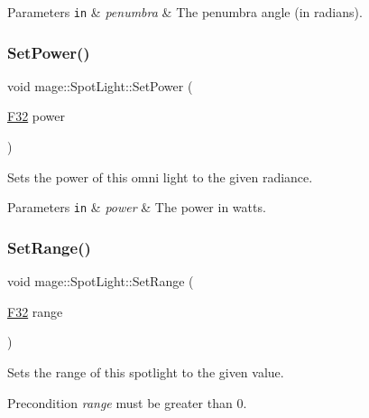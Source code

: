 \begin{DoxyParams}[1]{Parameters}
\mbox{\tt in}  & {\em penumbra} & The penumbra angle (in radians). \\
\hline
\end{DoxyParams}
\hypertarget{classmage_1_1_spot_light_aa2f5ad93e148d2d4fcf1512869c1ffa2}{}\label{classmage_1_1_spot_light_aa2f5ad93e148d2d4fcf1512869c1ffa2} 
\subsubsection{\texorpdfstring{Set\+Power()}{SetPower()}}
{\footnotesize\ttfamily void mage\+::\+Spot\+Light\+::\+Set\+Power (\begin{DoxyParamCaption}\item[{\hyperlink{namespacemage_aa97e833b45f06d60a0a9c4fc22ae02c0}{F32}}]{power }\end{DoxyParamCaption})\hspace{0.3cm}{\ttfamily [noexcept]}}

Sets the power of this omni light to the given radiance.


\begin{DoxyParams}[1]{Parameters}
\mbox{\tt in}  & {\em power} & The power in watts. \\
\hline
\end{DoxyParams}
\hypertarget{classmage_1_1_spot_light_a96f8d35fe374f9d06c49d68a3ac1f213}{}\label{classmage_1_1_spot_light_a96f8d35fe374f9d06c49d68a3ac1f213} 
\subsubsection{\texorpdfstring{Set\+Range()}{SetRange()}}
{\footnotesize\ttfamily void mage\+::\+Spot\+Light\+::\+Set\+Range (\begin{DoxyParamCaption}\item[{\hyperlink{namespacemage_aa97e833b45f06d60a0a9c4fc22ae02c0}{F32}}]{range }\end{DoxyParamCaption})\hspace{0.3cm}{\ttfamily [noexcept]}}

Sets the range of this spotlight to the given value.

\begin{DoxyPrecond}{Precondition}
{\itshape range} must be greater than 0. 
\end{DoxyPrecond}

